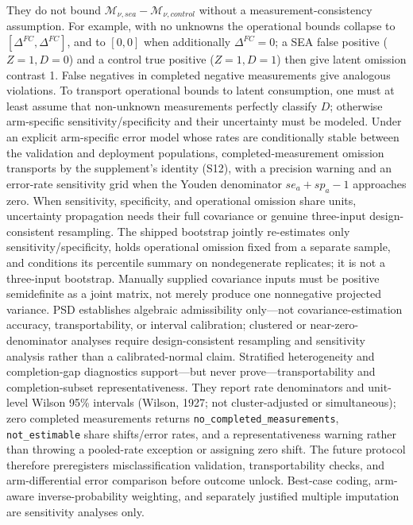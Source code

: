 \documentclass[
  11pt]{article}
\begin{document}
They do not bound \(\mathcal M_{\nu,sea}-\mathcal M_{\nu,control}\)
without a measurement-consistency assumption. For example, with no
unknowns the operational bounds collapse to
\([\Delta^{FC},\Delta^{FC}]\), and to \([0,0]\) when additionally
\(\Delta^{FC}=0\); a SEA false positive (\(Z=1,D=0\)) and a control true
positive (\(Z=1,D=1\)) then give latent omission contrast 1. False
negatives in completed negative measurements give analogous violations.
To transport operational bounds to latent consumption, one must at least
assume that non-unknown measurements perfectly classify \(D\); otherwise
arm-specific sensitivity/specificity and their uncertainty must be
modeled. Under an explicit arm-specific error model whose rates are
conditionally stable between the validation and deployment populations,
completed-measurement omission transports by the supplement's identity
(S12), with a precision warning and an error-rate sensitivity grid when
the Youden denominator \(se_a+sp_a-1\) approaches zero. When
sensitivity, specificity, and operational omission share units,
uncertainty propagation needs their full covariance or genuine
three-input design-consistent resampling. The shipped bootstrap jointly
re-estimates only sensitivity/specificity, holds operational omission
fixed from a separate sample, and conditions its percentile summary on
nondegenerate replicates; it is not a three-input bootstrap. Manually
supplied covariance inputs must be positive semidefinite as a joint
matrix, not merely produce one nonnegative projected variance. PSD
establishes algebraic admissibility only---not covariance-estimation
accuracy, transportability, or interval calibration; clustered or
near-zero-denominator analyses require design-consistent resampling and
sensitivity analysis rather than a calibrated-normal claim. Stratified
heterogeneity and completion-gap diagnostics support---but never
prove---transportability and completion-subset representativeness. They
report rate denominators and unit-level Wilson 95\% intervals (Wilson,
1927; not cluster-adjusted or simultaneous); zero completed measurements
returns \texttt{no\_completed\_measurements}, \texttt{not\_estimable}
share shifts/error rates, and a representativeness warning rather than
throwing a pooled-rate exception or assigning zero shift. The future
protocol therefore preregisters misclassification validation,
transportability checks, and arm-differential error comparison before
outcome unlock. Best-case coding, arm-aware inverse-probability
weighting, and separately justified multiple imputation are sensitivity
analyses only.
\end{document}
